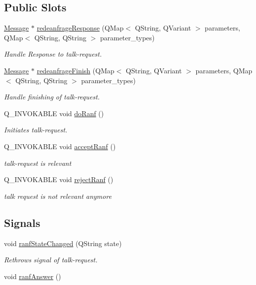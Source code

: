 \subsection*{Public Slots}
\begin{DoxyCompactItemize}
\item 
\hyperlink{class_message}{Message} $\ast$ \hyperlink{class_listener_client_a1557164978c13ba9badb565f4a6167ba}{redeanfrage\+Response} (Q\+Map$<$ Q\+String, Q\+Variant $>$ parameters, Q\+Map$<$ Q\+String, Q\+String $>$ parameter\+\_\+types)
\begin{DoxyCompactList}\small\item\em Handle Response to talk-\/request. \end{DoxyCompactList}\item 
\hyperlink{class_message}{Message} $\ast$ \hyperlink{class_listener_client_ab4f525f280d015e3af0aeb0fd2ad941f}{redeanfrage\+Finish} (Q\+Map$<$ Q\+String, Q\+Variant $>$ parameters, Q\+Map$<$ Q\+String, Q\+String $>$ parameter\+\_\+types)
\begin{DoxyCompactList}\small\item\em Handle finishing of talk-\/request. \end{DoxyCompactList}\item 
Q\+\_\+\+I\+N\+V\+O\+K\+A\+B\+L\+E void \hyperlink{class_listener_client_a9a658a95c62226e6b8617a50a390036a}{do\+Ranf} ()
\begin{DoxyCompactList}\small\item\em Initiates talk-\/request. \end{DoxyCompactList}\item 
Q\+\_\+\+I\+N\+V\+O\+K\+A\+B\+L\+E void \hyperlink{class_listener_client_a9b3ba155fff647e5482db33528465cb1}{accept\+Ranf} ()
\begin{DoxyCompactList}\small\item\em talk-\/request is relevant \end{DoxyCompactList}\item 
Q\+\_\+\+I\+N\+V\+O\+K\+A\+B\+L\+E void \hyperlink{class_listener_client_a8dfc5ddcd32ee500e9c715f44b2284f4}{reject\+Ranf} ()
\begin{DoxyCompactList}\small\item\em talk request is not relevant anymore \end{DoxyCompactList}\end{DoxyCompactItemize}
\subsection*{Signals}
\begin{DoxyCompactItemize}
\item 
void \hyperlink{class_listener_client_a5db4c41d2acb7a8efba7f24e4b7a29b8}{ranf\+State\+Changed} (Q\+String state)
\begin{DoxyCompactList}\small\item\em Rethrows signal of talk-\/request. \end{DoxyCompactList}\item 
void \hyperlink{class_listener_client_aeff4410c66969c8ed771483b8d8fa4d2}{ranf\+Answer} ()
\end{DoxyCompactItemize}
